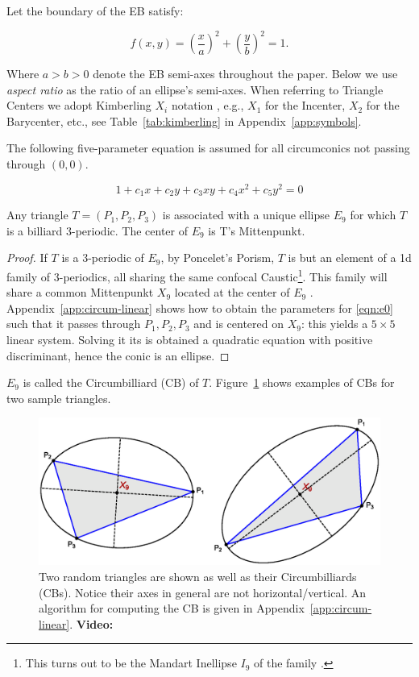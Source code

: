 Let the boundary of the EB satisfy:

\begin{equation}
\label{eqn:billiard-f}
f(x,y)=\left(\frac{x}{a}\right)^2+\left(\frac{y}{b}\right)^2=1.
\end{equation}

Where $a>b>0$ denote the EB semi-axes throughout the paper. Below we use {\em aspect ratio} as the ratio of an ellipse's semi-axes. When referring to Triangle Centers we adopt Kimberling $X_i$ notation \cite{etc}, e.g., $X_1$ for the Incenter, $X_2$ for the Barycenter, etc., see Table~\ref{tab:kimberling} in Appendix~\ref{app:symbols}.

The following five-parameter equation is assumed for all circumconics not passing through $(0,0)$.

\begin{equation}
1 + c_1 x + c_2 y + c_3 x y + c_4 x^2 + c_5 y^2=0
\label{eqn:e0}
\end{equation}

\begin{proposition}
Any triangle $T=(P_1,P_2,P_3)$ is associated with a unique 
ellipse $E_9$ for which $T$ is a billiard 3-periodic. The center of $E_9$ is T's Mittenpunkt.
\end{proposition}

\begin{proof}
If $T$ is a 3-periodic of $E_9$, by Poncelet's Porism, $T$ is but an element of a 1d family of 3-periodics, all sharing the same confocal Caustic\footnote{This turns out to be the Mandart Inellipse $I_9$ of the family \cite{mw}.}. This family will share a common Mittenpunkt $X_9$ located at the center of $E_9$  \cite{reznik2020-intelligencer}. Appendix~\ref{app:circum-linear} shows how to obtain the parameters for \eqref{eqn:e0} such that it passes through $P_1,P_2,P_3$ and is centered on $X_9$: this yields a $5{\times}5$ linear system. Solving it its is obtained a quadratic equation with positive discriminant, hence the conic is an ellipse.
\end{proof}

$E_9$ is called the Circumbilliard (CB) of $T$. Figure~\ref{fig:circumbilliard} shows examples of CBs for two sample triangles.

\begin{figure}[H]
    \centering
    \includegraphics[width=.8\textwidth]{pics_eps_new/0010_circumplot}
    \caption{Two random triangles are shown as well as their Circumbilliards (CBs). Notice their axes in general are not horizontal/vertical. An algorithm for computing the CB is given in Appendix~\ref{app:circum-linear}. \textbf{Video:} \cite[PL\#02]{reznik2020-playlist-circum}}
    \label{fig:circumbilliard}
\end{figure}


